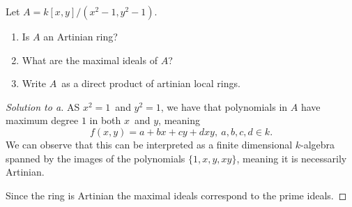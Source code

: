 \documentclass[11pt]{article}
\begin{document}
\begin{prob}
    Let $A = k[x,y]/(x^2 - 1, y^2 - 1)$. 

    \begin{enumerate}[label=\alph*)]
        \item Is $A$ an Artinian ring? 
        \item What are the maximal ideals of $A$? 
        \item Write $A$ as a direct product of artinian local rings.
    \end{enumerate}
\end{prob}
\begin{proof}[Solution to a]
    AS $x^2 = 1$ and $y^2 = 1$, we have 
    that polynomials in $A$ 
    have maximum degree $1$ in both $x$ and $y$, meaning 
    \[
        f(x,y) = a + bx + cy + dxy, \ a,b,c,d \in k. 
    \]
    We can observe that this can be interpreted 
    as a finite dimensional $k$-algebra spanned by the images 
    of the polynomials $\{1,x,y,xy\}$, meaning 
    it is necessarily Artinian. 

    Since the ring is Artinian the maximal 
    ideals correspond to the prime ideals. 
\end{proof}
\end{document}
